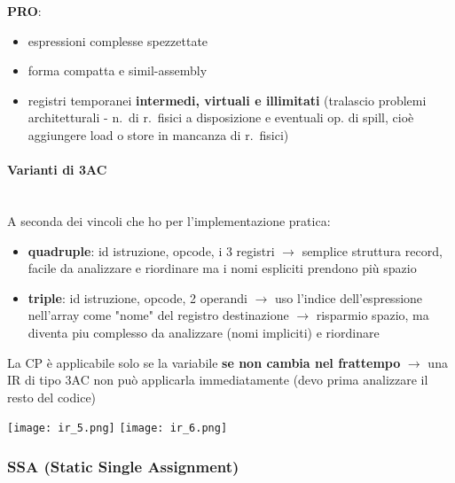 \textbf{PRO}:
\begin{itemize}
  \item espressioni complesse spezzettate
  \item forma compatta e simil-assembly
  \item registri temporanei \textbf{intermedi, virtuali e illimitati} (tralascio problemi architetturali - n.~di r.~fisici a disposizione e eventuali op. di spill, cio\`e aggiungere load o store in mancanza di r.~fisici)
\end{itemize}

\paragraph{Varianti di 3AC}~\\

A seconda dei vincoli che ho per l'implementazione pratica:\\

\noindent\begin{minipage}[c]{.7\textwidth}
  \begin{itemize}
    \item \textbf{quadruple}: id istruzione, opcode, i 3 registri $\rightarrow$ semplice struttura record, facile da analizzare e riordinare ma i nomi espliciti prendono pi\`u spazio
    \item \textbf{triple}: id istruzione, opcode, 2 operandi $\rightarrow$ uso l'indice dell'espressione nell'array come "nome" del registro destinazione $\rightarrow$ risparmio spazio, ma diventa piu complesso da analizzare (nomi impliciti) e riordinare
  \end{itemize}
  \begin{emphasize}[frametitle={Inapplicabilit\`a diretta della Constant Propagation con forma 3AC}]
    La CP \`e applicabile solo se la variabile \textbf{se non cambia nel frattempo} $\rightarrow$ una IR di tipo 3AC non pu\`o applicarla immediatamente (devo prima analizzare il resto del codice)
  \end{emphasize}
\end{minipage}
\begin{minipage}[c]{.3\textwidth}
  \centering
  \texttt{[image: ir\_5.png]}
  \texttt{[image: ir\_6.png]}
\end{minipage}

\subsubsection{SSA (Static Single Assignment)}

